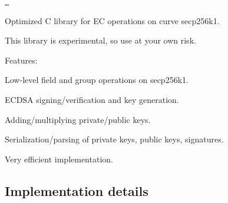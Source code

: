 \href{https://travis-ci.org/bitcoin/secp256k1}{\texttt{ }}

Optimized C library for EC operations on curve secp256k1.

This library is experimental, so use at your own risk.

Features\+:
\begin{DoxyItemize}
\item Low-\/level field and group operations on secp256k1.
\item E\+C\+D\+SA signing/verification and key generation.
\item Adding/multiplying private/public keys.
\item Serialization/parsing of private keys, public keys, signatures.
\item Very efficient implementation.
\end{DoxyItemize}

\subsection*{Implementation details }


